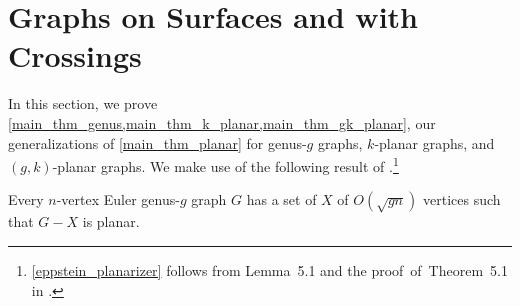 \documentclass{patmorin}
\begin{document}
\section{Graphs on Surfaces and with Crossings}
\label{genus_section}
\label{k_planar_section}

In this section, we prove \cref{main_thm_genus,main_thm_k_planar,main_thm_gk_planar}, our generalizations of \cref{main_thm_planar} for genus-$g$ graphs, $k$-planar graphs, and $(g,k)$-planar graphs. We make use of the following result  of \citet{eppstein:dynamic}.\footnote{\cref{eppstein_planarizer} follows from Lemma~5.1 and the proof~of~Theorem~5.1 in \cite{eppstein:dynamic}.}

\begin{thm}
\label{eppstein_planarizer}
  Every $n$-vertex Euler genus-$g$ graph $G$ has a set of $X$ of $O(\sqrt{gn})$ vertices such that $G-X$ is planar.
\end{thm}





\end{document}
